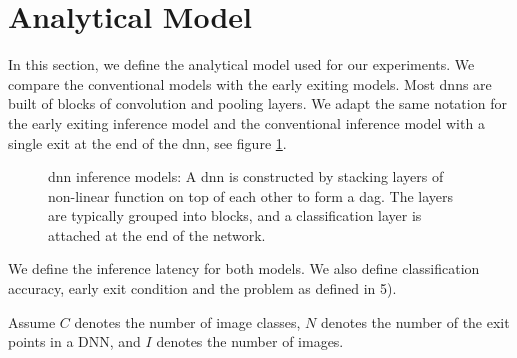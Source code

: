 \newpage\section{Analytical Model} \label{sec:ee-metrics}

In this section, we define the analytical model used for our experiments. We compare the conventional models with the early exiting models. Most \gls{dnn}s are built of blocks of convolution and pooling layers. We adapt the same notation for the early exiting inference model and the conventional inference model with a single exit at the end of the \gls{dnn}, see figure \ref{fig:inference_models}.
\begin{figure}
	\centering
	\captionsetup[subfigure]{justification=centering, farskip=1pt,captionskip=1pt}
	\hfill
	\caption[\gls{dnn} structure]{\gls{dnn} inference models: A \gls{dnn} is constructed by stacking layers of non-linear function on top of each other to form a \gls{dag}. The layers are typically grouped into blocks, and a classification layer is attached at the end of the network.}
	\label{fig:inference_models}
\end{figure}	
We define the inference latency for both models. We also define classification accuracy, early exit condition and the problem as defined in 5). 

Assume $ C $ denotes the number of image classes, $ N $ denotes the number of the exit points in a DNN, and $ I $ denotes the number of images.

